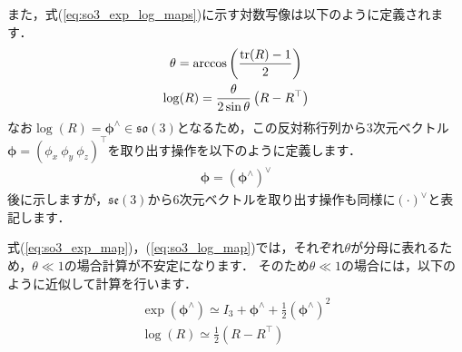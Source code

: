 また，式(\ref{eq:so3_exp_log_maps})に示す対数写像は以下のように定義されます．
%
\begin{align}
  \begin{gathered}
    \theta = \arccos \left( \frac{{\rm tr}(R) - 1}{ 2 } \right) \\
    \log( R ) = \frac{ \theta }{ 2 \sin \theta } \left( R - R^{\top} \right)
  \end{gathered}
  \label{eq:so3_log_map}
\end{align}
%
なお$\log \left( R \right) = \boldsymbol \phi^{\wedge} \in \mathfrak{so}(3)$となるため，この反対称行列から3次元ベクトル$\boldsymbol \phi = \left( \phi_{x} ~ \phi_{y} ~ \phi_{z} \right)^{\top}$を取り出す操作を以下のように定義します．
%
\begin{align}
  \boldsymbol \phi = \left( \boldsymbol \phi^{\wedge} \right)^{\vee}
\end{align}
%
後に示しますが，$\mathfrak{se}(3)$から6次元ベクトルを取り出す操作も同様に$\left( \cdot \right)^{\vee}$と表記します．

式(\ref{eq:so3_exp_map})，(\ref{eq:so3_log_map})では，それぞれ$\theta$が分母に表れるため，$\theta \ll 1$の場合計算が不安定になります．
そのため$\theta \ll 1$の場合には，以下のように近似して計算を行います．
%
\begin{align}
  \begin{gathered}
    \exp \left( \boldsymbol \phi^{\wedge} \right) \simeq I_{3} + \boldsymbol \phi^{\wedge} + \frac{1}{2} \left( \boldsymbol \phi^{\wedge} \right)^{2} \\
%
    \log \left( R \right) \simeq \frac{1}{2} \left( R - R^{\top} \right)
  \end{gathered}
  \label{eq:so3_exp_log_maps_approx}
\end{align}


